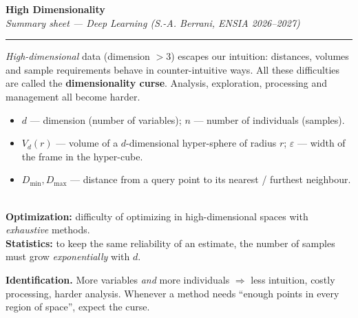 \documentclass[10pt,a4paper]{article}
\begin{document}
\begin{center}
    {\LARGE\bfseries\color{themeblue} High Dimensionality}\\[3pt]
    {\small\itshape Summary sheet --- Deep Learning (S.-A. Berrani, ENSIA 2026--2027)}\\[3pt]
    \textcolor{themeblue}{\rule{\textwidth}{0.6pt}}
\end{center}

\begin{tcolorbox}[
    colframe=themeblue,
    colback=lightbg,
    coltitle=white,
    fonttitle=\bfseries\sffamily,
    title={Core idea \& notation},
    arc=2mm,
    boxrule=0.6pt,
    left=8pt, right=8pt, top=5pt, bottom=5pt
]
\textit{High-dimensional} data (dimension $> 3$) escapes our intuition: distances, volumes and sample requirements behave in counter-intuitive ways. All these difficulties are called the \textbf{dimensionality curse}. Analysis, exploration, processing and management all become harder.
\begin{itemize}[leftmargin=14pt, itemsep=2pt, topsep=2pt]
    \item $d$ --- dimension (number of variables); $n$ --- number of individuals (samples).
    \item $V_d(r)$ --- volume of a $d$-dimensional hyper-sphere of radius $r$; $\varepsilon$ --- width of the frame in the hyper-cube.
    \item $D_{\min}, D_{\max}$ --- distance from a query point to its nearest / furthest neighbour.
\end{itemize}
\end{tcolorbox}

\vspace{5pt}

\\[4pt]
\textbf{Optimization:} difficulty of optimizing in high-dimensional spaces with \textit{exhaustive} methods.\\
\textbf{Statistics:} to keep the same reliability of an estimate, the number of samples must grow \textit{exponentially} with $d$.\\[4pt]
\begin{tcolorbox}[
    colframe=accentred,
    colback=white,
    arc=1.5mm,
    boxrule=0.5pt,
    left=8pt, right=8pt, top=5pt, bottom=5pt
]
\textbf{Identification.} More variables \textit{and} more individuals $\Rightarrow$ less intuition, costly processing, harder analysis. Whenever a method needs ``enough points in every region of space'', expect the curse.
\end{tcolorbox}
\end{document}
